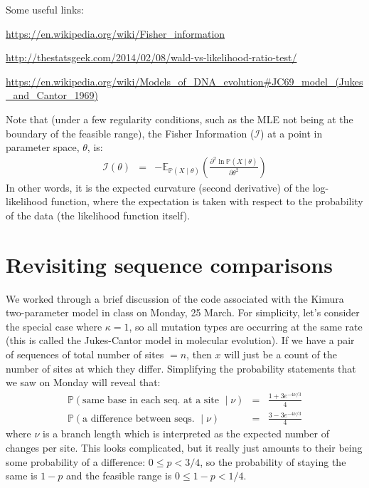 \documentclass[11pt]{article}
\renewcommand{\Pr}{\mathbb{P}}
\newcommand{\myA}{e^{-4\nu/3}}
\begin{document}
Some useful links: 
\begin{compactenum}
    \item \url{https://en.wikipedia.org/wiki/Fisher_information}
    \item \url{http://thestatsgeek.com/2014/02/08/wald-vs-likelihood-ratio-test/}
    \item \url{https://en.wikipedia.org/wiki/Models_of_DNA_evolution#JC69_model_(Jukes_and_Cantor_1969)}
\end{compactenum}

Note that (under a few regularity conditions, such as the MLE not being 
at the boundary of the feasible range), the Fisher Information ($\mathcal{I}$) at a point in
parameter space, $\theta$, is:
\begin{eqnarray}
\mathcal{I}(\theta) & = & - \mathbb{E}_{\Pr(X\mid \theta)}
\left(\frac{\partial^2 \ln \Pr(X\mid\theta)}{\partial \theta^2}\right)
\end{eqnarray}
In other words, it is the expected curvature (second derivative) of the log-likelihood function, where the expectation is taken with respect to
the probability of the data (the likelihood function itself).

\section*{Revisiting sequence comparisons}
We worked through a brief discussion of the code associated with the
    Kimura two-parameter model in class on Monday, 25 March.
For simplicity, let's consider the special case where $\kappa=1$, so all mutation types
    are occurring at the same rate (this is called the Jukes-Cantor model in molecular evolution).
If we have a pair of sequences of total number of sites $ =n$, then $x$ will just be a count of the number
    of sites at which they differ.
Simplifying the probability statements that we saw on Monday will reveal that:
\begin{eqnarray}
\Pr(\mbox{same base in each seq.~at a site }\mid \nu) & = & \frac{1 + 3 \myA}{4} \\
\Pr(\mbox{a difference between seqs. }\mid \nu) & = & \frac{3 - 3 \myA}{4}
\end{eqnarray}
where $\nu$ is a branch length which is interpreted as the expected number of changes per site.
This looks complicated, but it really just amounts to their being some 
probability of a difference: $0\leq p < 3/4$, so the probability of staying the
same is $1-p$  and the feasible range is $0\leq 1- p < 1/4$.
\end{document}
